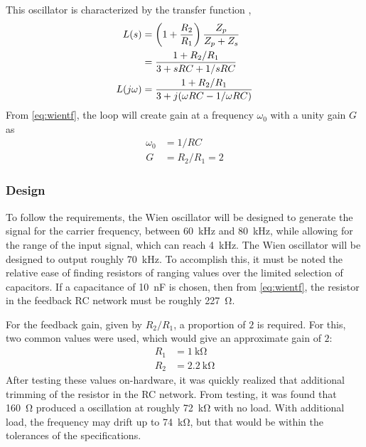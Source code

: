 \documentclass[11pt,letter,notitlepage]{article}
\begin{document}
	\noindent This oscillator is characterized by the transfer function \cite{sedra1998microelectronic}, \begin{align}
		L(s) & = \left(1 + \frac{R_2}{R_1}\right) \frac{Z_p}{Z_p + Z_s} \notag \\
			& = \frac{1 + R_2 / R_1}{3 + s RC + 1/sRC} \notag \\
		L(j\omega) & = \frac{1 + R_2 / R_1}{3 + j (\omega RC - 1 / \omega R C)} \label{eq:wientf}
	\end{align}
	From \eqref{eq:wientf}, the loop will create gain at a frequency $\omega_0$ with a unity gain $G$ as \begin{align*}
		\omega_0 & = 1 / RC \\
		G & = R_2 / R_1 = 2
	\end{align*}

	\subsubsection{Design}
	To follow the requirements, the Wien oscillator will be designed to generate the signal for the carrier frequency, between \SI{60}{\kHz} and \SI{80}{\kHz}, while allowing for the range of the input signal, which can reach \SI{4}{\kHz}. The Wien oscillator will be designed to output roughly \SI{70}{\kHz}. To accomplish this, it must be noted the relative ease of finding resistors of ranging values over the limited selection of capacitors. If a capacitance of \SI{10}{\nano\farad} is chosen, then from \eqref{eq:wientf}, the resistor in the feedback RC network must be roughly \SI{227}{\ohm}.
	
	For the feedback gain, given by $R_2/R_1$, a proportion of $2$ is required. For this, two common values were used, which would give an approximate gain of $2$: \begin{align*}
		R_1 & = \SI{1}{\kohm} \\
		R_2 & = \SI{2.2}{\kohm}
	\end{align*}
	After testing these values on-hardware, it was quickly realized that additional trimming of the resistor in the RC network. From testing, it was found that \SI{160}{\ohm} produced a oscillation at roughly \SI{72}{\kohm} with no load. With additional load, the frequency may drift up to \SI{74}{\kohm}, but that would be within the tolerances of the specifications.
		\vspace{-1em}
\end{document}
